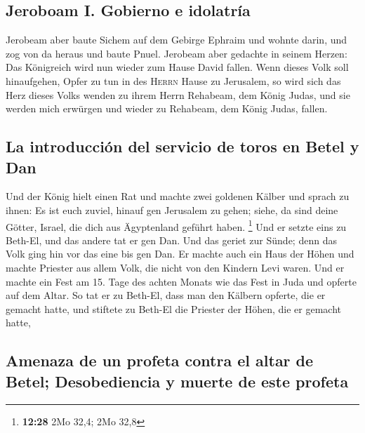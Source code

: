\hypertarget{jeroboam-i.-gobierno-e-idolatruxeda}{%
\subsection{Jeroboam I. Gobierno e
idolatría}\label{jeroboam-i.-gobierno-e-idolatruxeda}}

 Jerobeam aber baute Sichem auf dem Gebirge Ephraim und
wohnte darin, und zog von da heraus und baute Pnuel. 
Jerobeam aber gedachte in seinem Herzen: Das Königreich wird nun wieder
zum Hause David fallen.  Wenn dieses Volk soll
hinaufgehen, Opfer zu tun in des \textsc{Herrn} Hause zu Jerusalem, so
wird sich das Herz dieses Volks wenden zu ihrem Herrn Rehabeam, dem
König Judas, und sie werden mich erwürgen und wieder zu Rehabeam, dem
König Judas, fallen.

\hypertarget{la-introducciuxf3n-del-servicio-de-toros-en-betel-y-dan}{%
\subsection{La introducción del servicio de toros en Betel y
Dan}\label{la-introducciuxf3n-del-servicio-de-toros-en-betel-y-dan}}

 Und der König hielt einen Rat und machte zwei goldenen
Kälber und sprach zu ihnen: Es ist euch zuviel, hinauf gen Jerusalem zu
gehen; siehe, da sind deine Götter, Israel, die dich aus Ägyptenland
geführt haben. \footnote{\textbf{12:28} 2Mo 32,4; 2Mo 32,8}
 Und er setzte eins zu Beth-El, und das andere tat er gen
Dan.  Und das geriet zur Sünde; denn das Volk ging hin
vor das eine bis gen Dan.  Er machte auch ein Haus der
Höhen und machte Priester aus allem Volk, die nicht von den Kindern Levi
waren.  Und er machte ein Fest am 15. Tage des achten
Monats wie das Fest in Juda und opferte auf dem Altar. So tat er zu
Beth-El, dass man den Kälbern opferte, die er gemacht hatte, und
stiftete zu Beth-El die Priester der Höhen, die er gemacht hatte,

\hypertarget{amenaza-de-un-profeta-contra-el-altar-de-betel-desobediencia-y-muerte-de-este-profeta}{%
\subsection{Amenaza de un profeta contra el altar de Betel;
Desobediencia y muerte de este
profeta}\label{amenaza-de-un-profeta-contra-el-altar-de-betel-desobediencia-y-muerte-de-este-profeta}}

